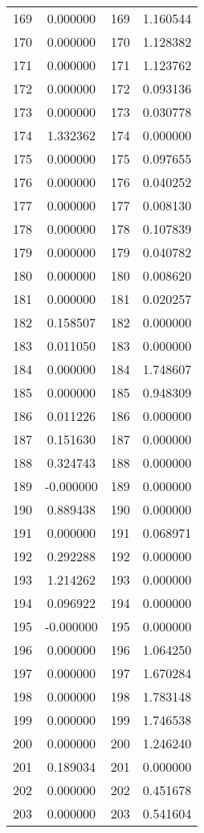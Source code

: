 \documentclass[12pt]{article}
\begin{document}
\begin{longtable}{@{}cccc@{}}
169 & 0.000000 & 169 & 1.160544 \\
170 & 0.000000 & 170 & 1.128382 \\
171 & 0.000000 & 171 & 1.123762 \\
172 & 0.000000 & 172 & 0.093136 \\
173 & 0.000000 & 173 & 0.030778 \\
174 & 1.332362 & 174 & 0.000000 \\
175 & 0.000000 & 175 & 0.097655 \\
176 & 0.000000 & 176 & 0.040252 \\
177 & 0.000000 & 177 & 0.008130 \\
178 & 0.000000 & 178 & 0.107839 \\
179 & 0.000000 & 179 & 0.040782 \\
180 & 0.000000 & 180 & 0.008620 \\
181 & 0.000000 & 181 & 0.020257 \\
182 & 0.158507 & 182 & 0.000000 \\
183 & 0.011050 & 183 & 0.000000 \\
184 & 0.000000 & 184 & 1.748607 \\
185 & 0.000000 & 185 & 0.948309 \\
186 & 0.011226 & 186 & 0.000000 \\
187 & 0.151630 & 187 & 0.000000 \\
188 & 0.324743 & 188 & 0.000000 \\
189 & -0.000000 & 189 & 0.000000 \\
190 & 0.889438 & 190 & 0.000000 \\
191 & 0.000000 & 191 & 0.068971 \\
192 & 0.292288 & 192 & 0.000000 \\
193 & 1.214262 & 193 & 0.000000 \\
194 & 0.096922 & 194 & 0.000000 \\
195 & -0.000000 & 195 & 0.000000 \\
196 & 0.000000 & 196 & 1.064250 \\
197 & 0.000000 & 197 & 1.670284 \\
198 & 0.000000 & 198 & 1.783148 \\
199 & 0.000000 & 199 & 1.746538 \\
200 & 0.000000 & 200 & 1.246240 \\
201 & 0.189034 & 201 & 0.000000 \\
202 & 0.000000 & 202 & 0.451678 \\
203 & 0.000000 & 203 & 0.541604 \\

\end{longtable}
\end{document}
